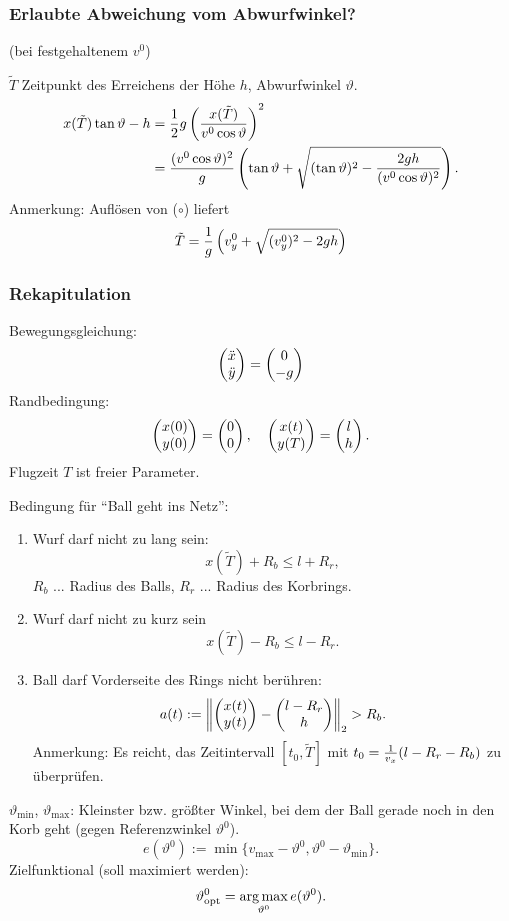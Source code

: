 \subsubsection*{Erlaubte Abweichung vom Abwurfwinkel?}
(bei festgehaltenem $v^0$)

$\tilde{T}$ Zeitpunkt des Erreichens der Höhe $h$, Abwurfwinkel $\vartheta$.
\begin{align*}
  x(\tilde{T}) \tan \vartheta - h
  &= \frac{1}{2} g \left( \frac{x(\tilde{T})}{v^0 \cos \vartheta} \right)^2 \\
  &= \frac{(v^0 \cos \vartheta)^2}{g} \left(
    \tan \vartheta + \sqrt{
    (\tan \vartheta)^2 - \frac{2gh}{(v^0 \cos \vartheta)^2}
    }\right).
\end{align*}
Anmerkung: Auflösen von ($\circ$) liefert
\[ \tilde{T} = \frac{1}{g} \left(
    v_y^0 + \sqrt{(v_y^0)^2 - 2gh}
  \right) \]

\subsubsection*{Rekapitulation}
Bewegungsgleichung:
\[ \begin{pmatrix} \ddot{x} \\ \ddot{y} \end{pmatrix} = \begin{pmatrix}0 \\ -g \end{pmatrix} \]
Randbedingung:
\[ \begin{pmatrix} x(0) \\ y(0) \end{pmatrix} = \begin{pmatrix} 0 \\ 0 \end{pmatrix}, \quad \begin{pmatrix}x(t) \\ y(T)\end{pmatrix}
  = \begin{pmatrix}l \\ h\end{pmatrix}. \]
Flugzeit $T$ ist freier Parameter.

Bedingung für ``Ball geht ins Netz'':
\begin{enumerate}
\item Wurf darf nicht zu lang sein:
  \[ x(\tilde{T}) + R_b \le l + R_r, \]
  $R_b $ ... Radius des Balls, $R_r$ ... Radius des Korbrings.
\item Wurf darf nicht zu kurz sein
  \[ x(\tilde{T}) - R_b \le l - R_r. \]
\item Ball darf Vorderseite des Rings nicht berühren:
  \[ a(t) := \left\| \begin{pmatrix}x(t) \\ y(t)\end{pmatrix} - \begin{pmatrix}l - R_r \\ h\end{pmatrix} \right\|_2 > R_b. \]
  Anmerkung: Es reicht, das Zeitintervall $[t_0, \tilde{T}]$ mit $t_0 =
  \frac{1}{v_x}(l - R_r - R_b)$ zu überprüfen.
\end{enumerate}

$\vartheta_{\min}$, $\vartheta_{\max}$: Kleinster bzw. größter Winkel, bei dem
der Ball gerade noch in den Korb geht (gegen Referenzwinkel $\vartheta^0$).
\[ e( \vartheta^0 ) := \min \{ v_{\max} - \vartheta^0, \vartheta^0 -
  \vartheta_{\min} \}. \]
Zielfunktional (soll maximiert werden):
\[ \vartheta_{\mathrm{opt}}^0 = \operatorname*{arg\,max}_{\vartheta^0} e( \vartheta^0). \]

